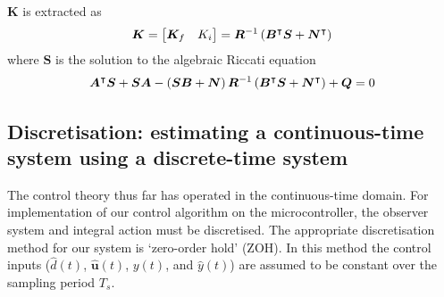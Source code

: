 $\boldsymbol{K}$ is extracted as
\begin{align*}
\boldsymbol{K}
=
\begin{bmatrix}
\boldsymbol{K}_f & K_i
\end{bmatrix}
=
\boldsymbol{R}^{{-} 1} \left(\boldsymbol{B}^\intercal \boldsymbol{S} + \boldsymbol{N}^\intercal\right)
\end{align*}
where $\boldsymbol{S}$ is the solution to the algebraic Riccati equation
\begin{align*}
\boldsymbol{A}^\intercal \boldsymbol{S} + \boldsymbol{S}\boldsymbol{A} - \left(\boldsymbol{S}\boldsymbol{B} + \boldsymbol{N}\right)\boldsymbol{R}^{{-} 1} \left(\boldsymbol{B}^\intercal \boldsymbol{S} + \boldsymbol{N}^\intercal\right) + \boldsymbol{Q} = 0
\end{align*}
\subsection{Discretisation: estimating a continuous-time system using a discrete-time system}\label{sec:disc}
The control theory thus far has operated in the continuous-time domain. For implementation of our control algorithm on the microcontroller, the observer system and integral action must be discretised. The appropriate discretisation method for our system is `zero-order hold' (ZOH). In this method the control inputs ($\hat{d}(t)$, $\hat{\boldsymbol{u}}(t)$, $y(t)$, and $\hat{y}(t)$) are assumed to be constant over the sampling period $T_s$.
